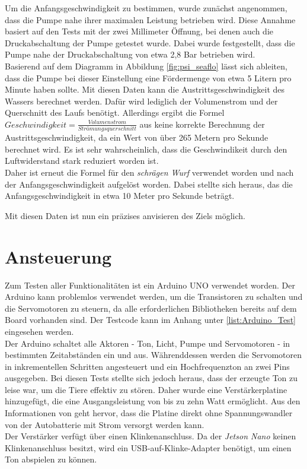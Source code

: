Um die Anfangsgeschwindigkeit zu bestimmen, wurde zunächst angenommen, dass die Pumpe nahe ihrer maximalen Leistung betrieben wird. Diese Annahme basiert auf den Tests mit der zwei Millimeter Öffnung, bei denen auch die Druckabschaltung der Pumpe getestet wurde. Dabei wurde festgestellt, dass die Pumpe nahe der Druckabschaltung von etwa 2,8 Bar betrieben wird.
\\
Basierend auf dem Diagramm in Abbildung \ref{fig:psi_seaflo} lässt sich ableiten, dass die Pumpe bei dieser Einstellung eine Fördermenge von etwa 5 Litern pro Minute haben sollte. Mit diesen Daten kann die Austrittsgeschwindigkeit des Wassers berechnet werden. Dafür wird lediglich der Volumenstrom und der Querschnitt des Laufs benötigt. Allerdings ergibt die Formel $Geschwindigkeit = \frac{Volumenstrom}{Strömungsquerschnitt}$ aus \cite{stroemungen} keine korrekte Berechnung der Austrittsgeschwindigkeit, da ein Wert von über 265 Metern pro Sekunde berechnet wird. Es ist sehr wahrscheinlich, dass die Geschwindikeit durch den Luftwiderstand stark reduziert worden ist.
\\
Daher ist erneut die Formel für den \textit{schrägen Wurf} verwendet worden und nach der Anfangsgeschwindigkeit aufgelöst worden. Dabei stellte sich heraus, das die Anfangsgeschwindigkeit in etwa 10 Meter pro Sekunde beträgt.

Mit diesen Daten ist nun ein präzises anvisieren des Ziels möglich.

\section{Ansteuerung}

Zum Testen aller Funktionalitäten ist ein Arduino UNO verwendet worden. Der Arduino kann problemlos verwendet werden, um die Transistoren zu schalten und die Servomotoren zu steuern, da alle erforderlichen Bibliotheken bereits auf dem Board vorhanden sind. Der Testcode kann im Anhang unter \ref{list:Arduino_Test} eingesehen werden.
\\
Der Arduino schaltet alle Aktoren - Ton, Licht, Pumpe und Servomotoren - in bestimmten Zeitabständen ein und aus. Währenddessen werden die Servomotoren in inkrementellen Schritten angesteuert und ein Hochfrequenzton an zwei Pins ausgegeben. Bei diesen Tests stellte sich jedoch heraus, dass der erzeugte Ton zu leise war, um die Tiere effektiv zu stören. Daher wurde eine Verstärkerplatine hinzugefügt, die eine Ausgangsleistung von bis zu zehn Watt ermöglicht. Aus den Informationen von \cite{am_sound_amp} geht hervor, dass die Platine direkt ohne Spannungswandler von der Autobatterie mit Strom versorgt werden kann.
\\
Der Verstärker verfügt über einen Klinkenanschluss. Da der \textit{Jetson Nano} keinen Klinkenanschluss besitzt, wird ein USB-auf-Klinke-Adapter benötigt, um einen Ton abspielen zu können.

